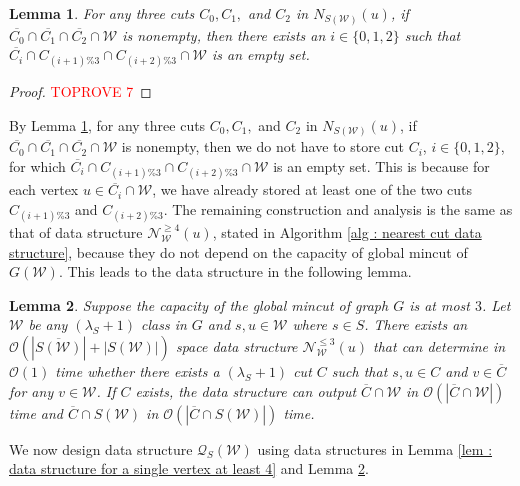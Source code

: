 \documentclass[letterpaper,11pt]{article}
\newtheorem{lemma}{Lemma}[]
\begin{document}
\begin{lemma} \label{lem : storing at most two cuts are sufficient}
    For any three cuts $C_0,C_1,$ and $C_2$ in $N_{S({\mathcal W})}(u)$, if $\overline{C_0}\cap \overline{C_1}\cap \overline{C_2}\cap {\mathcal W}$ is nonempty, then there exists an $i\in \{0,1,2\}$ such that $\overline{C_i}\cap C_{(i+1)\%3}\cap C_{(i+2)\%3}\cap {\mathcal W}$ is an empty set. 
\end{lemma}
\begin{proof}\textcolor{red}{TOPROVE 7}\end{proof}
By Lemma \ref{lem : storing at most two cuts are sufficient}, for any three cuts $C_0,C_1,$ and $C_2$ in $N_{S({\mathcal W})}(u)$, if $\overline{C_0}\cap \overline{C_1}\cap \overline{C_2}\cap {\mathcal W}$ is nonempty, then we do not have to store cut $C_i$, $i\in \{0,1,2\}$, for which $\overline{C_i}\cap C_{(i+1)\%3}\cap C_{(i+2)\%3}\cap {\mathcal W}$ is an empty set. This is because for each vertex $u\in \overline{C_i}\cap {\mathcal W}$, we have already stored at least one of the two cuts $C_{(i+1)\%3}$ and $ C_{(i+2)\%3}$. The remaining construction and analysis is the same as that of data structure ${\mathcal N}^{\ge 4}_{\mathcal W}(u)$, stated in Algorithm \ref{alg : nearest cut data structure}, because they do not depend on the capacity of global mincut of $G({\mathcal W})$. 
This leads to the data structure in the following lemma. 




\begin{lemma} \label{lem : data structure for a single vertex at most 3}
    Suppose the capacity of the global mincut of graph $G$ is at most $3$. Let ${\mathcal W}$ be any $(\lambda_S+1)$ class in $G$ and $s,u\in {\mathcal W}$ where $s\in S$. There exists an $\mathcal{O}(|\overline{S({\mathcal W})}|+|S({\mathcal W})|)$ space data structure ${\mathcal N}^{\le 3}_{\mathcal W}(u)$ that can determine in ${\mathcal O}(1)$ time whether there exists a $(\lambda_S+1)$ cut $C$ such that $s,u\in C$ and $v\in \overline{C}$ for any $v \in {\mathcal W}$. If $C$ exists, the data structure can output $\overline{C}\cap {\mathcal W}$ in ${\mathcal{O}}(|\overline{C}\cap {\mathcal W}|)$ time and $\overline{C}\cap S({\mathcal{W}})$ in ${\mathcal{O}}(|\overline{C}\cap S({\mathcal{W}})|)$ time. 
\end{lemma}
We now design data structure ${\mathcal Q}_S({\mathcal W})$ using data structures in Lemma \ref{lem : data structure for a single vertex at least 4} and Lemma \ref{lem : data structure for a single vertex at most 3}.\\
\end{document}
